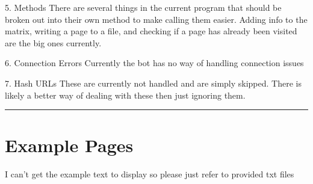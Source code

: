 \documentclass[12pt, letterpaper]{article}
\begin{document}
5. Methods
There are several things in the current program that should be broken out into their own method to make calling them easier. Adding info to the matrix, writing a page to a file, and checking if a page has already been visited are the big ones currently.

6. Connection Errors
Currently the bot has no way of handling connection issues

7. Hash URLs
These are currently not handled and are simply skipped. There is likely a better way of dealing with these then just ignoring them.

\rule{\textwidth}{0.5pt}
\section{Example Pages}
I can't get the example text to display so please just refer to provided txt files
\end{document}
